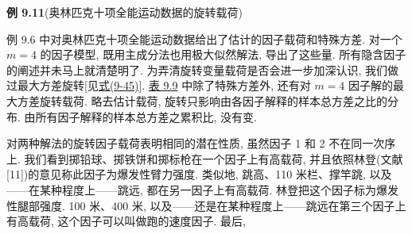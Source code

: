 \noindent\textbf{例 9.11}\quad (奥林匹克十项全能运动数据的旋转载荷)

例 9.6 中对奥林匹克十项全能运动数据给出了估计的因子载荷和特殊方差. 对一个 $m=4$ 的因子模型, 既用主成分法也用极大似然解法, 导出了这些量. 所有隐含因子的阐述并未马上就清楚明了. 为弄清旋转变量载荷是否会进一步加深认识, 我们做过最大方差旋转[见\hyperref[eq:9-45]{式(9-45)}]. \hyperref[tab:9.9]{表 9.9} 中除了特殊方差外, 还有对 $m=4$ 因子解的最大方差旋转载荷. 略去估计载荷, 旋转只影响由各因子解释的样本总方差之比的分布. 由所有因子解释的样本总方差之累积比, 没有变.

对两种解法的旋转因子载荷表明相同的潜在性质, 虽然因子 1 和 2 不在同一次序上. 我们看到掷铅球、掷铁饼和掷标枪在一个因子上有高载荷, 并且依照林登(文献[11])的意见称此因子为爆发性臂力强度. 类似地, 跳高、110 米栏、撑竿跳, 以及——在某种程度上——跳远, 都在另一因子上有高载荷. 林登把这个因子标为爆发性腿部强度. 100 米、400 米, 以及——还是在某种程度上——跳远在第三个因子上有高载荷, 这个因子可以叫做跑的速度因子. 最后,
